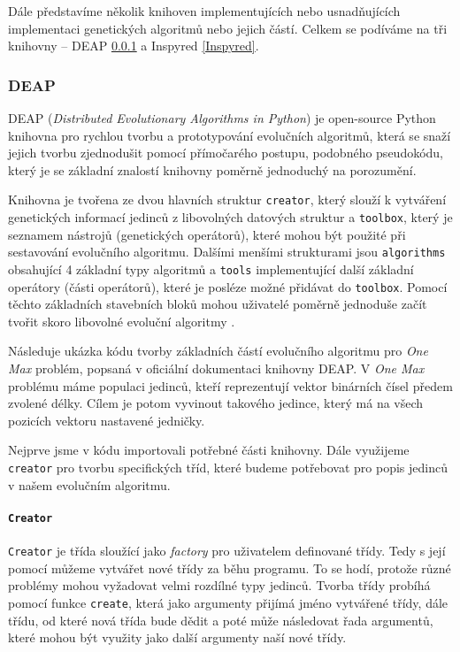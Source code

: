 Dále představíme několik knihoven implementujících nebo usnadňujících
implementaci genetických algoritmů nebo jejich částí. Celkem se podíváme na tři
knihovny -- DEAP \ref{DEAP} a Inspyred \ref{Inspyred}.

\subsubsection{DEAP} \label{DEAP}

DEAP (\emph{Distributed Evolutionary Algorithms in Python}) \citep{deapproject}
je open-source Python knihovna pro rychlou tvorbu a prototypování evolučních
algoritmů, která se snaží jejich tvorbu zjednodušit pomocí přímočarého postupu,
podobného pseudokódu, který je se základní znalostí knihovny poměrně jednoduchý
na porozumění. 

Knihovna je tvořena ze dvou hlavních struktur \texttt{creator}, který slouží k
vytváření genetických informací jedinců z libovolných datových struktur a
\texttt{toolbox}, který je seznamem nástrojů (genetických operátorů), které
mohou být použité při sestavování evolučního algoritmu. Dalšími menšími
strukturami jsou \texttt{algorithms} obsahující 4 základní typy algoritmů a
\texttt{tools} implementující další základní operátory (části operátorů), které
je posléze možné přidávat do \texttt{toolbox}. Pomocí těchto základních
stavebních bloků mohou uživatelé poměrně jednoduše začít tvořit skoro libovolné
evoluční algoritmy \citep{fortin2012deap}. 

Následuje ukázka kódu tvorby základních částí evolučního algoritmu pro
\emph{One Max} problém, popsaná v oficiální dokumentaci knihovny DEAP. V
\emph{One Max} problému máme populaci jedinců, kteří reprezentují vektor
binárních čísel předem zvolené délky. Cílem je potom vyvinout takového jedince,
který má na všech pozicích vektoru nastavené jedničky. 

Nejprve jsme v kódu importovali potřebné části knihovny. Dále využijeme
\texttt{creator} pro tvorbu specifických tříd, které budeme potřebovat pro
popis jedinců v našem evolučním algoritmu.

\paragraph{\texttt{Creator}} 
\texttt{Creator} je třída sloužící jako \emph{factory} pro uživatelem
definované třídy. Tedy s její pomocí můžeme vytvářet nové třídy za běhu
programu. To se hodí, protože různé problémy mohou vyžadovat velmi rozdílné
typy jedinců. Tvorba třídy probíhá pomocí funkce \texttt{create}, která jako
argumenty přijímá jméno vytvářené třídy, dále třídu, od které nová třída bude
dědit a poté může následovat řada argumentů, které mohou být využity jako další
argumenty naší nové třídy.


